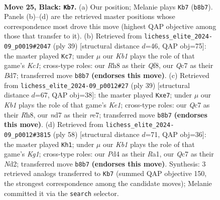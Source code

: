 \documentclass[11pt]{article}
\begin{document}
\clearpage

\begin{figure}[p]\centering
\begin{subfigure}{0.46\textwidth}\centering
\resizebox{\linewidth}{!}{%
\newchessgame
\chessboard[
  setfen={rk5r/p1qN1p1p/2pQ4/8/3p4/3P4/b4PPP/2R3K1 b - - 9 25},
  showmover=false,
  pgfstyle=straightmove, color=movearrow, markmove={b8-b7}
]}
\caption{}
\end{subfigure}\hfill
\begin{subfigure}{0.46\textwidth}\centering
\resizebox{\linewidth}{!}{%
\newchessgame
\chessboard[
  setfen={r1k2q1r/pp1bNp1p/5Qp1/8/8/8/PPP2PPP/2K1R3 b - - 2 20},
  showmover=false,
  pgfstyle=straightmove, color=movearrow, markmove={c8-c7}
]}
\caption{}
\end{subfigure}
\\[4pt]
\begin{subfigure}{0.46\textwidth}\centering
\resizebox{\linewidth}{!}{%
\newchessgame
\chessboard[
  setfen={r3k2r/4Rp1p/pqp5/7Q/8/8/PPP2PPP/3R2K1 b kq - 0 20},
  showmover=false,
  pgfstyle=straightmove, color=movearrow, markmove={e8-e7}
]}
\caption{}
\end{subfigure}\hfill
\begin{subfigure}{0.46\textwidth}\centering
\resizebox{\linewidth}{!}{%
\newchessgame
\chessboard[
  setfen={4r1k1/r1p2pp1/7p/P1qP4/1n2P3/8/3NQ1PP/RR4K1 w - - 2 30},
  showmover=false,
  pgfstyle=straightmove, color=movearrow, markmove={g1-h1}
]}
\caption{}
\end{subfigure}
\caption{\textbf{Move 25, Black: \texttt{Kb7}.} (a) Our position; Melanie plays \texttt{Kb7} (\texttt{b8b7}). Panels (b)--(d) are the retrieved master positions whose correspondence most drove this move (highest QAP objective among those that transfer to it). (b) Retrieved from \texttt{lichess\_elite\_2024-09\_p0019\#2047} (ply 39) [structural distance $d$=46, QAP obj=75]: the master played \texttt{Kc7}; under $\mu$ our \emph{Kb1} plays the role of that game's \emph{Kc1}; cross-type roles: our \emph{R}h8 as their \emph{Q}f8, our \emph{Q}c7 as their \emph{B}d7; transferred move \texttt{b8b7} \textbf{(endorses this move)}. (c) Retrieved from \texttt{lichess\_elite\_2024-09\_p0012\#27} (ply 39) [structural distance $d$=67, QAP obj=38]: the master played \texttt{Kxe7}; under $\mu$ our \emph{Kb1} plays the role of that game's \emph{Ke1}; cross-type roles: our \emph{Q}c7 as their \emph{R}h8, our \emph{n}d7 as their \emph{r}e7; transferred move \texttt{b8b7} \textbf{(endorses this move)}. (d) Retrieved from \texttt{lichess\_elite\_2024-09\_p0012\#3815} (ply 58) [structural distance $d$=71, QAP obj=36]: the master played \texttt{Kh1}; under $\mu$ our \emph{Kb1} plays the role of that game's \emph{Kg1}; cross-type roles: our \emph{P}d4 as their \emph{R}a1, our \emph{Q}c7 as their \emph{N}d2; transferred move \texttt{b8b7} \textbf{(endorses this move)}. Synthesis: 3 retrieved analogs transferred to \texttt{Kb7} (summed QAP objective 150, the strongest correspondence among the candidate moves); Melanie committed it via the \texttt{search} selector.}
\label{fig:thought-m49}
\end{figure}
\end{document}
